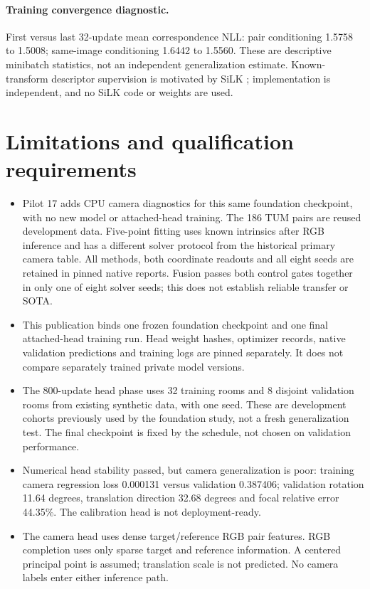 \documentclass[10pt]{article}
\begin{document}
\paragraph{Training convergence diagnostic.} First versus last 32-update mean correspondence NLL: pair conditioning 1.5758 to 1.5008; same-image conditioning 1.6442 to 1.5560. These are descriptive minibatch statistics, not an independent generalization estimate. Known-transform descriptor supervision is motivated by SiLK \cite{silk}; implementation is independent, and no SiLK code or weights are used.
\clearpage\section{Limitations and qualification requirements}
\begin{itemize}
\item Pilot 17 adds CPU camera diagnostics for this same foundation checkpoint, with no new model or attached-head training. The 186 TUM pairs are reused development data. Five-point fitting uses known intrinsics after RGB inference and has a different solver protocol from the historical primary camera table. All methods, both coordinate readouts and all eight seeds are retained in pinned native reports. Fusion passes both control gates together in only one of eight solver seeds; this does not establish reliable transfer or SOTA.
\item This publication binds one frozen foundation checkpoint and one final attached-head training run. Head weight hashes, optimizer records, native validation predictions and training logs are pinned separately. It does not compare separately trained private model versions.
\item The 800-update head phase uses 32 training rooms and 8 disjoint validation rooms from existing synthetic data, with one seed. These are development cohorts previously used by the foundation study, not a fresh generalization test. The final checkpoint is fixed by the schedule, not chosen on validation performance.
\item Numerical head stability passed, but camera generalization is poor: training camera regression loss 0.000131 versus validation 0.387406; validation rotation 11.64 degrees, translation direction 32.68 degrees and focal relative error 44.35\%. The calibration head is not deployment-ready.
\item The camera head uses dense target/reference RGB pair features. RGB completion uses only sparse target and reference information. A centered principal point is assumed; translation scale is not predicted. No camera labels enter either inference path.

\end{itemize}
\end{document}
